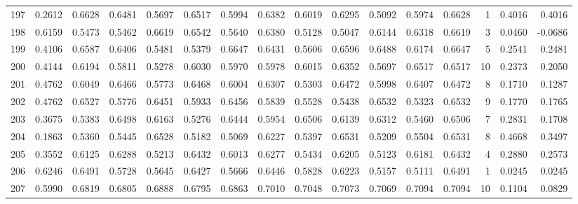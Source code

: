 \begin{tabular}{lrrrrrrrrrrrrrrr}
197 &      0.2612 &  0.6628 &  0.6481 &  0.5697 &  0.6517 &  0.5994 &  0.6382 &  0.6019 &  0.6295 &  0.5092 &   0.5974 &     0.6628 &      1 &                    0.4016 &                     0.4016 \\
198 &      0.6159 &  0.5473 &  0.5462 &  0.6619 &  0.6542 &  0.5640 &  0.6380 &  0.5128 &  0.5047 &  0.6144 &   0.6318 &     0.6619 &      3 &                    0.0460 &                    -0.0686 \\
199 &      0.4106 &  0.6587 &  0.6406 &  0.5481 &  0.5379 &  0.6647 &  0.6431 &  0.5606 &  0.6596 &  0.6488 &   0.6174 &     0.6647 &      5 &                    0.2541 &                     0.2481 \\
200 &      0.4144 &  0.6194 &  0.5811 &  0.5278 &  0.6030 &  0.5970 &  0.5978 &  0.6015 &  0.6352 &  0.5697 &   0.6517 &     0.6517 &     10 &                    0.2373 &                     0.2050 \\
201 &      0.4762 &  0.6049 &  0.6466 &  0.5773 &  0.6468 &  0.6004 &  0.6307 &  0.5303 &  0.6472 &  0.5998 &   0.6407 &     0.6472 &      8 &                    0.1710 &                     0.1287 \\
202 &      0.4762 &  0.6527 &  0.5776 &  0.6451 &  0.5933 &  0.6456 &  0.5839 &  0.5528 &  0.5438 &  0.6532 &   0.5323 &     0.6532 &      9 &                    0.1770 &                     0.1765 \\
203 &      0.3675 &  0.5383 &  0.6498 &  0.6163 &  0.5276 &  0.6444 &  0.5954 &  0.6506 &  0.6139 &  0.6312 &   0.5460 &     0.6506 &      7 &                    0.2831 &                     0.1708 \\
204 &      0.1863 &  0.5360 &  0.5445 &  0.6528 &  0.5182 &  0.5069 &  0.6227 &  0.5397 &  0.6531 &  0.5209 &   0.5504 &     0.6531 &      8 &                    0.4668 &                     0.3497 \\
205 &      0.3552 &  0.6125 &  0.6288 &  0.5213 &  0.6432 &  0.6013 &  0.6277 &  0.5434 &  0.6205 &  0.5123 &   0.6181 &     0.6432 &      4 &                    0.2880 &                     0.2573 \\
206 &      0.6246 &  0.6491 &  0.5728 &  0.5645 &  0.6427 &  0.5666 &  0.6446 &  0.5828 &  0.6223 &  0.5157 &   0.5111 &     0.6491 &      1 &                    0.0245 &                     0.0245 \\
207 &      0.5990 &  0.6819 &  0.6805 &  0.6888 &  0.6795 &  0.6863 &  0.7010 &  0.7048 &  0.7073 &  0.7069 &   0.7094 &     0.7094 &     10 &                    0.1104 &                     0.0829 \\

\end{tabular}
